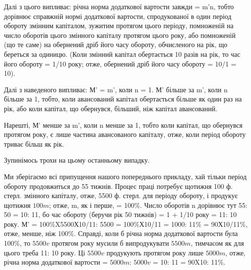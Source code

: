 \parcont{}  %
Далі з цього випливає: річна норма додаткової вартости завжди =
m'n, тобто дорівнює справжній нормі додаткової вартости, спродукованої
в один період обороту змінним капіталом, зужитим протягом цього
періоду, помноженій на число оборотів цього змінного капіталу протягом
цього року, або помноженій (що те саме) на обернений дріб його часу
обороту, обчисленого на рік, що береться за одиницю. (Коли
змінний капітал обертається 10 разів на рік, то час його обороту = 1/10 року;
отже, обернений дріб його часу обороту = 10/1 = 10).

Далі з наведеного випливає: М' = m', коли n = 1. М' більше за m',
коли n більше за 1, тобто, коли авансований капітал обертається більше
як один раз на рік, або коли капітал, що обернувся, більший, ніж капітал
авансований.

Нарешті, М' менше за m', коли n менше за 1, тобто коли капітал,
що обернувся протягом року, є лише частина авансованого капіталу, отже,
коли період обороту триває більш як рік.

Зупинімось трохи на цьому останньому випадку.

Ми зберігаємо всі припущення нашого попереднього прикладу, хай
тільки період обороту продовжиться до 55 тижнів. Процес праці потребує
щотижня 100 ф. стерл. змінного капіталу, отже, 5500 ф. стерл. для періоду
обороту, і продукує щотижня $100 m$; отже, m, як і перше, = 100\%.
Число оборотів n дорівнює тут 55: 50 = 10: 11, бо час обороту (беручи рік
50 тижнів) = 1 + 1/10 року = 11: 10 року. М' = 100\%X5500Х10/11: 5500 =
100\%Х10/11 = 1000: 11\% = 90Х10/11\%, отже, менше, ніж 100\%. Справді,
коли б річна норма додаткової вартости була 100\%, то $5500 v$ протягом
року мусили б випродукувати $5500 m$, тимчасом як для цього треба 11: 10
року. Ці $5500 v$ продукують протягом року лише $5000 m$, отже, річна
норма додаткової вартости = $5000 m$: $5000 v$ = 10: 11 = 90X10: 11\%.

